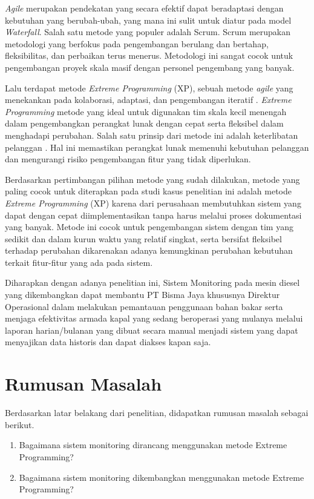\textit{Agile} merupakan pendekatan yang secara efektif dapat beradaptasi dengan kebutuhan yang berubah-ubah, yang mana ini sulit untuk diatur pada model \textit{Waterfall}. Salah satu metode yang populer adalah Scrum. Scrum merupakan metodologi yang berfokus pada pengembangan berulang dan bertahap, fleksibilitas, dan perbaikan terus menerus. Metodologi ini sangat cocok untuk pengembangan proyek skala masif dengan personel pengembang yang banyak.

Lalu terdapat metode \textit{Extreme Programming} (XP), sebuah metode \textit{agile} yang menekankan pada kolaborasi, adaptasi, dan pengembangan iteratif \parencite{article:matharu}. \textit{Extreme Programming} metode yang ideal untuk digunakan tim skala kecil menengah dalam pengembangkan perangkat lunak dengan cepat serta fleksibel dalam menghadapi perubahan. Salah satu prinsip dari metode ini adalah keterlibatan pelanggan \parencite{article:matharu}. Hal ini memastikan perangkat lunak memenuhi kebutuhan pelanggan dan mengurangi risiko pengembangan fitur yang tidak diperlukan.

Berdasarkan pertimbangan pilihan metode yang sudah dilakukan, metode yang paling cocok untuk diterapkan pada studi kasus penelitian ini adalah metode \textit{Extreme Programming} (XP) karena dari perusahaan membutuhkan sistem yang dapat dengan cepat diimplementasikan tanpa harus melalui proses dokumentasi yang banyak. Metode ini cocok untuk pengembangan sistem dengan tim yang sedikit dan dalam kurun waktu yang relatif singkat, serta bersifat fleksibel terhadap perubahan dikarenakan adanya kemungkinan perubahan kebutuhan terkait fitur-fitur yang ada pada sistem.

Diharapkan dengan adanya penelitian ini, Sistem Monitoring pada mesin diesel yang dikembangkan dapat membantu PT Bisma Jaya khususnya Direktur Operasional dalam melakukan pemantauan penggunaan bahan bakar serta menjaga efektivitas armada kapal yang sedang beroperasi yang mulanya melalui laporan harian/bulanan yang dibuat secara manual menjadi sistem yang dapat menyajikan data historis dan dapat diakses kapan saja.



\section{Rumusan Masalah}

Berdasarkan latar belakang dari penelitian, didapatkan rumusan masalah sebagai berikut.

\begin{enumerate}
    \item Bagaimana sistem monitoring dirancang menggunakan metode Extreme Programming?
    \item Bagaimana sistem monitoring dikembangkan menggunakan metode Extreme Programming?
\end{enumerate}

